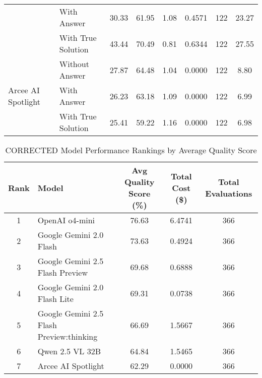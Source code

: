 \documentclass{article}
\begin{document}
\begin{table*}[htbp]
{\begin{tabular}{@{}llcccccc@{}}
& With Answer & 30.33 & 61.95 & 1.08 & 0.4571 & 122 & 23.27 \\
& With True Solution & 43.44 & 70.49 & 0.81 & 0.6344 & 122 & 27.55 \\
\midrule
\multirow{3}{*}{Arcee AI Spotlight} 
& Without Answer & 27.87 & 64.48 & 1.04 & 0.0000 & 122 & 8.80 \\
& With Answer & 26.23 & 63.18 & 1.09 & 0.0000 & 122 & 6.99 \\
& With True Solution & 25.41 & 59.22 & 1.16 & 0.0000 & 122 & 6.98 \\
\bottomrule
\end{tabular}%
}
\end{table*}

\begin{table}[htbp]
\centering
\caption{CORRECTED Model Performance Rankings by Average Quality Score}
\label{tab:model_rankings_corrected}
\begin{tabular}{@{}clccc@{}}
\toprule
\textbf{Rank} & \textbf{Model} & \textbf{Avg Quality Score (\%)} & \textbf{Total Cost (\$)} & \textbf{Total Evaluations} \\
\midrule
1 & OpenAI o4-mini & 76.63 & 6.4741 & 366 \\
2 & Google Gemini 2.0 Flash & 73.63 & 0.4924 & 366 \\
3 & Google Gemini 2.5 Flash Preview & 69.68 & 0.6888 & 366 \\
4 & Google Gemini 2.0 Flash Lite & 69.31 & 0.0738 & 366 \\
5 & Google Gemini 2.5 Flash Preview:thinking & 66.69 & 1.5667 & 366 \\
6 & Qwen 2.5 VL 32B & 64.84 & 1.5465 & 366 \\
7 & Arcee AI Spotlight & 62.29 & 0.0000 & 366 \\
\bottomrule
\end{tabular}
\end{table}
\end{document}
